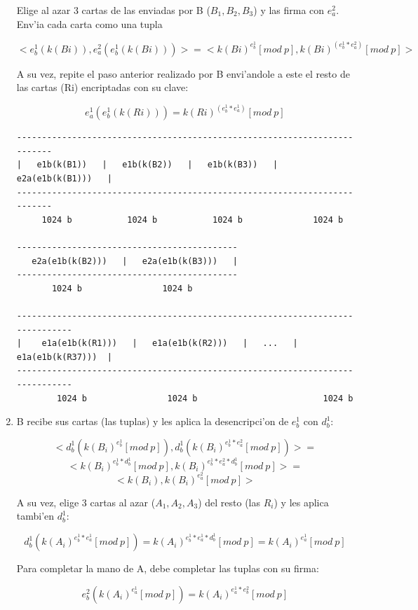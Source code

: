 \begin{enumerate}
Elige al azar 3 cartas de las enviadas por B ($B_1, B_2, B_3$) y las firma con $e^2_a$. Env'ia cada carta como una tupla

$$	<e^1_b(k(Bi)), 			e^2_a(e^1_b(k(Bi)))> = 
	<k(Bi)^{e^1_b} [mod\ p], 	k(Bi)^(e^1_b * e^2_a) [mod\ p]> $$
	
A su vez, repite el paso anterior realizado por B envi'andole a este el resto de las cartas (Ri) encriptadas con su clave:

$$	e^1_a(e^1_b(k(Ri))) = k(Ri)^(e^1_b * e^1_a) [mod\ p] $$
	

\begin{verbatim}
--------------------------------------------------------------------------
|   e1b(k(B1))   |   e1b(k(B2))   |   e1b(k(B3))   |   e2a(e1b(k(B1)))   |
--------------------------------------------------------------------------
     1024 b           1024 b           1024 b              1024 b         

--------------------------------------------
   e2a(e1b(k(B2)))   |   e2a(e1b(k(B3)))   |
--------------------------------------------
       1024 b                1024 b         

------------------------------------------------------------------------------
|    e1a(e1b(k(R1)))   |   e1a(e1b(k(R2)))   |   ...   |   e1a(e1b(k(R37)))  |
------------------------------------------------------------------------------
        1024 b                1024 b                         1024 b           
\end{verbatim}
	
	
	
	
	
\item B recibe sus cartas (las tuplas) y les aplica la desencripci'on de $e^1_b$ con $d^1_b$:

$$	<d^1_b(k(B_i)^{e^1_b} [mod\ p]), 		d^1_b(k(B_i)^{e^1_b * e^2_a} [mod\ p])> = $$
$$	<k(B_i)^{e^1_b * d^1_b} [mod\ p], 	k(B_i)^{e^1_b * e^2_a * d^1_b} [mod\ p]> = $$
$$	<k(B_i), 						k(B_i)^{e^2_a} [mod\ p]> $$

A su vez, elige 3 cartas al azar ($A_1, A_2, A_3$) del resto (las $R_i$) y les aplica tambi'en $d^1_b$:
	
$$	d^1_b(k(A_i)^{e^1_b * e^1_a} [mod\ p]) = 
	k(A_i)^{e^1_b * e^1_a * d^1_b} [mod\ p] =
	k(A_i)^{e^1_a} [mod\ p] $$

Para completar la mano de A, debe completar las tuplas con su firma:

$$	e^2_b(k(A_i)^{e^1_a} [mod\ p]) =
	k(A_i)^{e^1_a * e^2_b} [mod\ p] $$
	

\end{enumerate}
